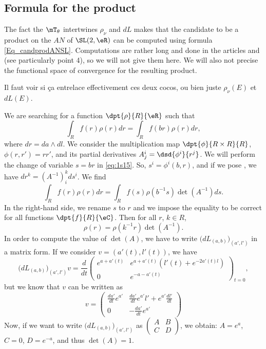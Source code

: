 \subsection{Formula for the product}

The fact the $\mT_{\theta}$ intertwines $\rho_{\nu}$ and $dL$ makes that the candidate to be a product on the $AN$ of $\SL(2,\eR)$ can be computed using formula \eqref{Eq_candprodANSL}. Computations are rather long and done in the articles \cite{StrictSolvableSym} and \cite{Biel-Massar} (see particularly point 4), so we will not give them here. We will also not precise the functional space of convergence for the resulting product.

\begin{probleme}
Il faut voir si ça entrelace effectivement ces deux cocos, ou bien juste $\rho_{\nu}(E)$ et $dL(E)$.
\label{Probintertw}
\end{probleme}

We are searching for a function $\dpt{\rho}{R}{\eR}$ such that
\begin{equation}\label{eq:1s15}
  \int_Rf(r)\rho(r)dr=\int_Rf(br)\rho(r)dr,
\end{equation}
where $dr=da\wedge dl$. We consider the multiplication map $\dpt{\phi}{R\times R}{R}$, $\phi(r,r')=rr'$, and its partial derivatives $A^i_j=\dsd{\phi^i}{r^j}$.  We will perform the change of variable $ s =br$ in \eqref{eq:1s15}. So, $ s^i=\phi^i(b,r)$, and if we pose , we have $dr^k=(A^{-1})^k_id s^i$. We find
\[
  \int_Rf(r)\rho(r)dr=\int_Rf( s)\rho(b^{-1} s)\det(A^{-1})d s.
\]
In the right-hand side, we rename $ s$ to $r$ and we impose the equality to be correct for all functions $\dpt{f}{R}{\eC}$. Then for all $r$, $k\in R$,
\[
   \rho(r)=\rho(k^{-1} r)\det(A^{-1}).
\]
 In order to compute the value of $\det(A)$, we have to write $\big(dL_{(a,b)}\big)_{(a',l')}$ in a matrix form. If we consider $v=(a'(t),l'(t))$, we have
\begin{equation}
\big(dL_{(a,b)}\big)_{(a',l')}v=\frac{d}{dt}\begin{pmatrix}
e^{a+a'(t)} & e^{a+a'(t)}(l'(t)+e^{-2a'(t)l}) \\
0 & e^{-a-a'(t)}
\end{pmatrix}_{t=0},
\end{equation}
but we know that $v$ can be written as
\[
  v=\begin{pmatrix}
\frac{da'}{dt}e^{a'} & \frac{da'}{dt}e^{a'}l'+e^{a'}\frac{dl'}{dt} \\
0 & -\frac{da'}{dt}e^{a'}
\end{pmatrix}
\]
Now, if we want to write $\big(dL_{(a,b)}\big)_{(a',l')}$ as $\begin{pmatrix}A&B\\C&D\end{pmatrix}$, we obtain: $A=e^a$, $C=0$, $D=e^{-a}$, and thus $\det(A)=1$.

